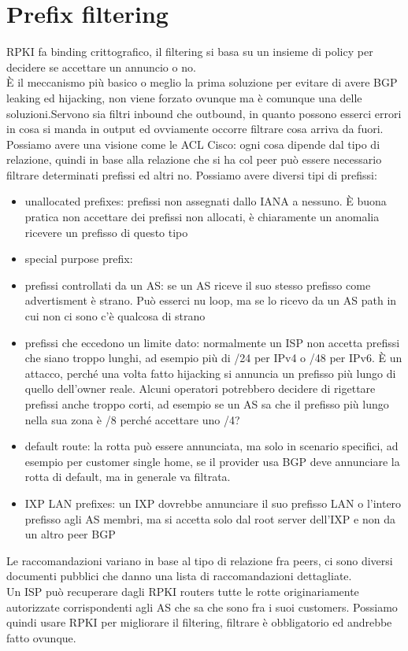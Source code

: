 \documentclass[12pt, oneside]{extbook} %
\begin{document}
\section{Prefix filtering}
RPKI fa binding crittografico, il filtering si basa su un insieme di policy per decidere se accettare un annuncio o no.\\È il meccanismo più basico o meglio la prima soluzione per evitare di avere BGP leaking ed hijacking, non viene forzato ovunque ma è comunque una delle soluzioni.Servono sia filtri inbound che outbound, in quanto possono esserci errori in cosa si manda in output ed ovviamente occorre filtrare cosa arriva da fuori.\\Possiamo avere una visione come le ACL Cisco:
ogni cosa dipende dal tipo di relazione, quindi in base alla relazione che si ha col peer può essere necessario filtrare determinati prefissi ed altri no. Possiamo avere diversi tipi di prefissi:
\begin{itemize}
	\item unallocated prefixes: prefissi non assegnati dallo IANA a nessuno. È buona pratica non accettare dei prefissi non allocati, è chiaramente un anomalia ricevere un prefisso di questo tipo
	\item special purpose prefix: 
	\item prefissi controllati da un AS: se un AS riceve il suo stesso prefisso come advertisment è strano. Può esserci nu loop, ma se lo ricevo da un AS path in cui non ci sono c'è qualcosa di strano
	\item prefissi che eccedono un limite dato: normalmente un ISP non accetta prefissi che siano troppo lunghi, ad esempio più di /24 per IPv4 o /48 per IPv6. È un attacco, perché una volta fatto hijacking si annuncia un prefisso più lungo di quello dell'owner reale. Alcuni operatori potrebbero decidere di rigettare prefissi anche troppo corti, ad esempio se un AS sa che il prefisso più lungo nella sua zona è /8 perché accettare uno /4?
	\item default route: la rotta può essere annunciata, ma solo in scenario specifici, ad esempio per customer single home, se il provider usa BGP deve annunciare la rotta di default, ma in generale va filtrata.
	\item IXP LAN prefixes: un IXP dovrebbe annunciare il suo prefisso LAN o l'intero prefisso agli AS membri, ma si accetta solo dal root server dell'IXP e non da un altro peer BGP
\end{itemize}
Le raccomandazioni variano in base al tipo di relazione fra peers, ci sono diversi documenti pubblici che danno una lista di raccomandazioni dettagliate.\\Un ISP può recuperare dagli RPKI routers tutte le rotte originariamente autorizzate corrispondenti agli AS che sa che sono fra i suoi customers. Possiamo quindi usare RPKI per migliorare il filtering, filtrare è obbligatorio ed andrebbe fatto ovunque.
\end{document}
